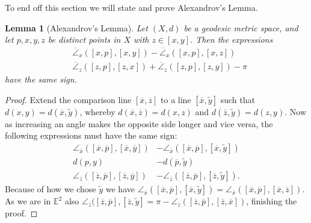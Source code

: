 \documentclass[11pt, a4paper, oneside]{memoir}
\theoremstyle{plain}\newtheorem{theorem}[subsection]{Theorem}
\newtheorem{lemma}[subsection]{Lemma}
\theoremstyle{definition}
\newcommand{\E}{\mathbb{E}}
\begin{document}
To end off this section we will state and prove Alexandrov's Lemma.
\begin{lemma}[Alexandrov's Lemma]\label{lem:alex}
    Let \((X,d)\) be a geodesic metric space, and let \(p,x,y,z\) be distinct points in \(X\) with \(z\in [x,y]\).
    Then the expressions
    \begin{align*}
        &\overline{\angle}_x([x,p],[x,y])-\overline{\angle}_x([x,p],[x,z])\\
        &\overline{\angle}_z([z,p],[z,x])+\overline{\angle}_z([z,p],[z,y])-\pi
    \end{align*}
    have the same sign.
\end{lemma}
\begin{proof}
Extend the comparison line \([\overline{x},\overline{z}]\) to a line \([\overline{x},\tilde{y}]\) such that \(d(x,y)=d(\overline{x},\tilde{y})\), whereby \(d(\overline{x},\overline{z})=d(x,z)\) and \(d(\overline{z},\tilde{y})=d(z,y)\).
Now as increasing an angle makes the opposite side longer and vice versa, the following expressions must have the same sign:
\begin{align*}
    \angle_{\overline{x}}([\overline{x},\overline{p}],[\overline{x},\overline{y}])
            &-  \angle_{\overline{x}}([\overline{x},\overline{p}],[\overline{x},\tilde{y}])\\
    d(p,y)  &-  d(\overline{p},\tilde{y})\\
    \angle_{\overline{z}}([\overline{z},\overline{p}],[\overline{z},\overline{y}])  &-  \angle_{\overline{z}}           ([\overline{z},\overline{p}],[\overline{z},\tilde{y}]).
\end{align*}
Because of how we chose \(\tilde{y}\) we have \(\angle_{\overline{x}}([\overline{x},\overline{p}],[\overline{x},\tilde{y}])=\angle_{\overline{x}}([\overline{x},\overline{p}],[\overline{x},\overline{z}])\).
As we are in \(\E^2\) also \(\angle_{\overline{z}}([\overline{z},\overline{p}],[\overline{z},\tilde{y}]=\pi-\angle_{\overline{z}}([\overline{z},\overline{p}],[\overline{z},\overline{x}])\), finishing the proof.
\end{proof}



\end{document}

